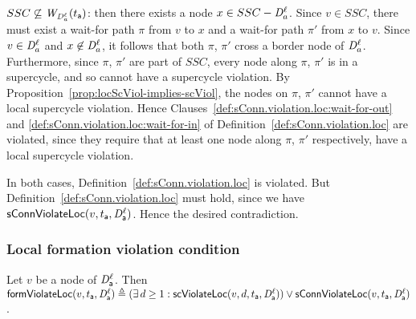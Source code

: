 \item $SSC \not\subseteq \mathit{W}_{\mathit{D}_{a}^{\ell}}({t_{\mathsf{a}}})$: then there exists a node $x \in SSC -
  \mathit{D}_{a}^{\ell}$. Since $v \in SSC$, there must exist a wait-for path $\pi$
  from $v$ to $x$ and a wait-for path $\pi'$ from $x$ to
  $v$. Since $v \in \mathit{D}_{a}^{\ell}$ and $x \not\in \mathit{D}_{a}^{\ell}$, it
  follows that both $\pi$, $\pi'$  cross a border node of
  $\mathit{D}_{a}^{\ell}$. Furthermore, since $\pi$, $\pi'$ are part of $SSC$, every node
  along $\pi$, $\pi'$ is in a supercycle, and so cannot have a supercycle violation.
  By Proposition~\ref{prop:locScViol-implies-scViol}, the nodes on
  $\pi$, $\pi'$  cannot have a local supercycle violation.
  Hence Clauses~\ref{def:sConn.violation.loc:wait-for-out} and
  \ref{def:sConn.violation.loc:wait-for-in} of Definition~\ref{def:sConn.violation.loc} are violated,
  since they require that at least one node along $\pi$, $\pi'$ respectively, have a local supercycle violation.
  
\en
In both cases,  Definition~\ref{def:sConn.violation.loc} is violated. 
But  Definition~\ref{def:sConn.violation.loc} must hold, since we have $\mathsf{sConnViolateLoc}(v,t_{\mathsf{a}},\mathit{D}_{\mathsf{a}}^{\ell})$. 
Hence the desired contradiction.
\epr






\subsubsection{Local formation violation condition}

\label{def:locFormation.violation}
Let $v$ be a node of $\mathit{D}_{\mathsf{a}}^{\ell}$.
Then $\mathsf{formViolateLoc}(v,t_{\mathsf{a}},\mathit{D}_{\mathsf{a}}^{\ell})  \triangleq  (\exists\, d \ge 1: \mathsf{scViolateLoc}(v,d,t_{\mathsf{a}},\mathit{D}_{\mathsf{a}}^{\ell})) \lor \mathsf{sConnViolateLoc}(v,t_{\mathsf{a}},\mathit{D}_{\mathsf{a}}^{\ell})$.
\ed
%



